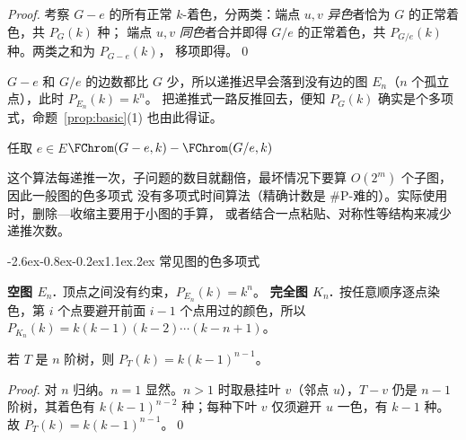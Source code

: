 \documentclass[10pt]{article}
\makeatletter
\renewcommand\section{\@startsection{section}{1}{\z@}%
  {-2.6ex\@plus -0.8ex\@minus -0.2ex}{1.1ex\@plus.2ex}%
  {\normalfont\large\bfseries}}
\newcommand{\chrom}[2]{P_{#1}(#2)}        %
\makeatother
\begin{document}
\begin{proof}
考察 $G-e$ 的所有正常 $k$-着色，分两类：端点 $u,v$ \emph{异色}者恰为 $G$ 的正常着色，共 $\chrom{G}{k}$ 种；
端点 $u,v$ \emph{同色}者合并即得 $G/e$ 的正常着色，共 $\chrom{G/e}{k}$ 种。两类之和为 $\chrom{G-e}{k}$，
移项即得。\qed
\end{proof}

\begin{remark}
$G-e$ 和 $G/e$ 的边数都比 $G$ 少，所以递推迟早会落到没有边的图 $E_n$（$n$ 个孤立点），此时 $\chrom{E_n}{k}=k^{n}$。
把递推式一路反推回去，便知 $\chrom{G}{k}$ 确实是个多项式，命题~\ref{prop:basic}(1) 也由此得证。
\end{remark}

\begin{algorithm}[H]
\DontPrintSemicolon{}
\KwOut{$\chrom{G}{k}$}
任取 $e\in E$\;\Return $\FChrom(G-e,k)-\FChrom(G/e,k)$\;
\caption{用删除—收缩递推计算色多项式}
\end{algorithm}

\begin{remark}
这个算法每递推一次，子问题的数目就翻倍，最坏情况下要算 $O(2^{m})$ 个子图，因此一般图的色多项式
没有多项式时间算法（精确计数是 \#P-难的）。实际使用时，删除—收缩主要用于小图的手算，
或者结合一点粘贴、对称性等结构来减少递推次数。
\end{remark}

\section{常见图的色多项式}\label{sec:common}

\textbf{空图 $E_n$.}\, 顶点之间没有约束，$\chrom{E_n}{k}=k^{n}$。
\textbf{完全图 $K_n$.}\, 按任意顺序逐点染色，第 $i$ 个点要避开前面 $i-1$ 个点用过的颜色，所以
$\chrom{K_n}{k}=k(k-1)(k-2)\cdots(k-n+1)$。

\begin{theorem}\label{thm:tree}
若 $T$ 是 $n$ 阶树，则 $\chrom{T}{k}=k(k-1)^{n-1}$。
\end{theorem}
\begin{proof}
对 $n$ 归纳。$n=1$ 显然。$n>1$ 时取悬挂叶 $v$（邻点 $u$），$T-v$ 仍是 $n-1$ 阶树，其着色有
$k(k-1)^{n-2}$ 种；每种下叶 $v$ 仅须避开 $u$ 一色，有 $k-1$ 种。故 $\chrom{T}{k}=k(k-1)^{n-1}$。\qed
\end{proof}
\end{document}
